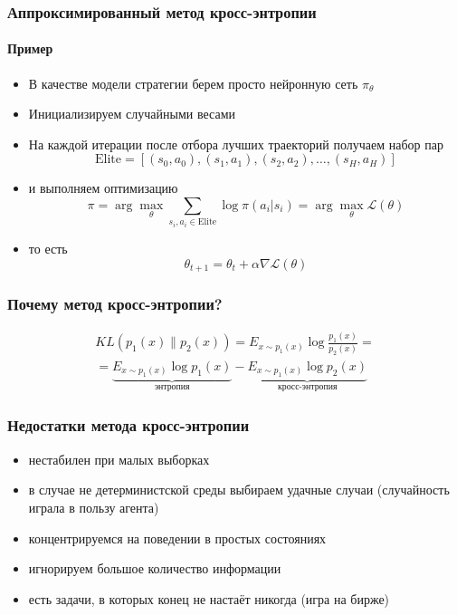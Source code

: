 \documentclass[fullscreen=true, bookmarks=true, hyperref={pdfencoding=unicode}]{beamer}
\begin{document}
\begin{frame}
  \frametitle{Аппроксимированный метод кросс-энтропии}
  \framesubtitle{Пример}

  \begin{itemize}
    \item В качестве модели стратегии берем просто нейронную сеть $\pi_\theta$

    \item Инициализируем случайными весами

    \item На каждой итерации после отбора лучших траекторий получаем набор пар
      $$\text{Elite} = [(s_0, a_0), (s_1, a_1), (s_2, a_2), \dots, (s_H, a_H )]$$

    \item и выполняем оптимизацию
      $$ \pi = \arg\max\limits_\theta \sum\limits_{s_i, a_i \in \text{Elite}} \log \pi(a_i|s_i) = \arg\max\limits_\theta \mathscr{L}(\theta)$$

    \item то есть
      $$ \theta_{t+1} = \theta_{t} + \alpha \nabla \mathscr{L}(\theta) $$
  \end{itemize}
\end{frame}


\begin{frame}
  \frametitle{Почему метод кросс-энтропии?}

  \begin{align*}
    KL(p_1(x) \| p_2(x)) = E_{x \sim p_1(x)} \log \frac{p_1(x)}{p_2(x)} = \\
    =
    \underbrace{E_{x \sim p_1(x)} \log {p_1(x)}}_{
      \text{энтропия}
    } -
    \underbrace{E_{x \sim p_1(x)} \log {p_2(x)}}_{
    \text{кросс-энтропия}
    }
  \end{align*}

\end{frame}


\begin{frame}
  \frametitle{Недостатки метода кросс-энтропии}

  \begin{itemize}
    \item нестабилен при малых выборках
    \item в случае не детерминистской среды выбираем удачные случаи (случайность играла в пользу агента)
    \item концентрируемся на поведении в простых состояниях
    \item игнорируем большое количество информации
    \item есть задачи, в которых конец не настаёт никогда (игра на бирже)
  \end{itemize}
\end{frame}
\end{document}
